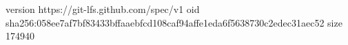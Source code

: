 version https://git-lfs.github.com/spec/v1
oid sha256:058ee7af7bf83433bffaaebfcd108caf94affe1eda6f5638730c2edec31aec52
size 174940
